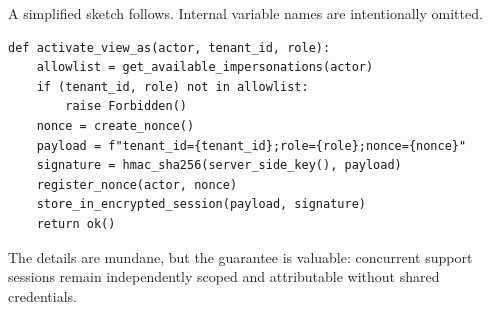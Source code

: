 A simplified sketch follows. Internal variable names are intentionally omitted.

\begin{lstlisting}[style=python, caption={Simplified view-as signing flow.}]
def activate_view_as(actor, tenant_id, role):
    allowlist = get_available_impersonations(actor)
    if (tenant_id, role) not in allowlist:
        raise Forbidden()
    nonce = create_nonce()
    payload = f"tenant_id={tenant_id};role={role};nonce={nonce}"
    signature = hmac_sha256(server_side_key(), payload)
    register_nonce(actor, nonce)
    store_in_encrypted_session(payload, signature)
    return ok()
\end{lstlisting}

The details are mundane, but the guarantee is valuable: concurrent support sessions remain independently scoped and attributable without shared credentials.
